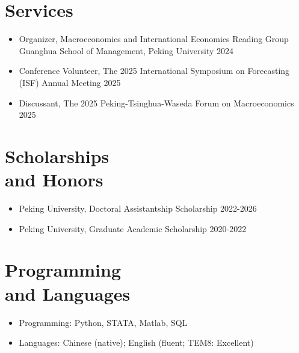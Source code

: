\documentclass[margin]{res}
\begin{document}
\begin{resume}
\section{Services}
\begin{itemize} \itemsep -2pt
  \item Organizer, Macroeconomics and International Economics Reading Group\\
  Guanghua School of Management, Peking University \hfill 2024
  \item Conference Volunteer, The 2025 International Symposium on Forecasting (ISF) Annual Meeting \hfill 2025
  \item Discussant, The 2025 Peking-Tsinghua-Waseda Forum on Macroeconomics \hfill 2025
\end{itemize}

\section{Scholarships\\and Honors}
\begin{itemize} \itemsep -2pt
  \item Peking University, Doctoral Assistantship Scholarship \hfill 2022-2026
  \item Peking University, Graduate Academic Scholarship \hfill 2020-2022
\end{itemize}


\section{Programming\\and Languages}
\begin{itemize} \itemsep -2pt
  \item Programming: Python, STATA, Matlab, SQL
  \item Languages: Chinese (native); English (fluent; TEM8: Excellent)
\end{itemize}

\end{resume}
\end{document}
